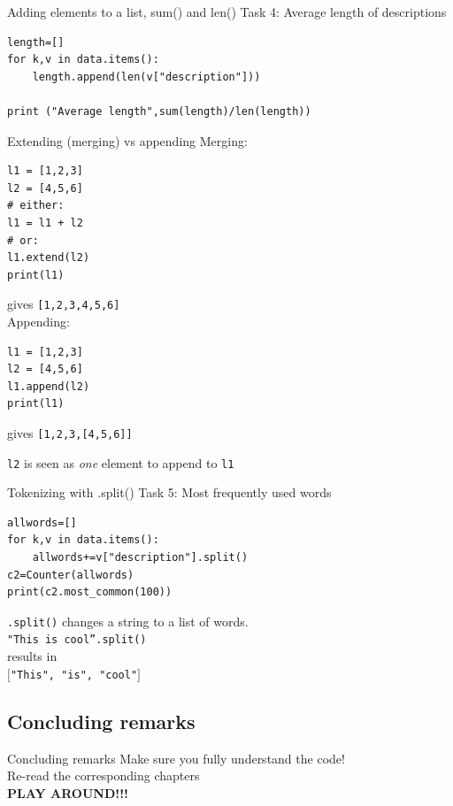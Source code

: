 \documentclass{beamer}
\begin{document}
\begin{frame}[fragile]{Adding elements to a list, sum() and len()}
Task 4: Average length of descriptions
\begin{lstlisting}
length=[]
for k,v in data.items():
    length.append(len(v["description"]))
    
print ("Average length",sum(length)/len(length))
\end{lstlisting}

\end{frame}


\begin{frame}[fragile]{Extending (merging) vs appending}
Merging:
\begin{lstlisting}
l1 = [1,2,3]
l2 = [4,5,6]
# either:
l1 = l1 + l2
# or:
l1.extend(l2)
print(l1)
\end{lstlisting}
gives \texttt{[1,2,3,4,5,6]}
~\\

Appending:
\begin{lstlisting}
l1 = [1,2,3]
l2 = [4,5,6]
l1.append(l2)
print(l1)
\end{lstlisting}
gives \texttt{[1,2,3,[4,5,6]]}

\texttt{l2} is seen as \emph{one} element to append to \texttt{l1}
\end{frame}


\begin{frame}[fragile]{Tokenizing with .split()}
Task 5: Most frequently used words
\begin{lstlisting}
allwords=[]
for k,v in data.items():
    allwords+=v["description"].split()
c2=Counter(allwords)
print(c2.most_common(100))
\end{lstlisting}
\scriptsize{
\texttt{.split()} changes a string to a list of words.\\ \texttt{"This is cool''.split()} \\results in\\ \texttt{$[$"This", "is", "cool"$]$}\\
}
\end{frame}


\subsection{Concluding remarks}
\begin{frame}{Concluding remarks}
Make sure you fully understand the code!\\
\vspace{1cm}
Re-read the corresponding chapters\\
\vspace{1cm}
\textbf{PLAY AROUND!!!}\\
\end{frame}
\end{document}
